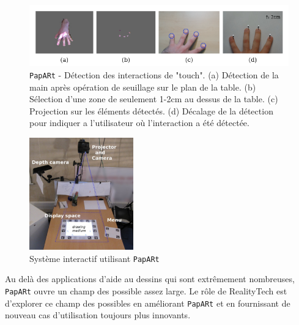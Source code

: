 \begin{figure}
\centering
\includegraphics[width=\linewidth]{images/paparttouch}
\caption{ \texttt{PapARt} - Détection des interactions de "touch". (a) Détection de la main après opération de seuillage sur le plan de la table. (b) Sélection d'une zone de seulement 1-2cm au dessus de la table. (c) Projection sur les éléments détectés. (d) Décalage de la détection pour indiquer a l'utilisateur où l'interaction a été détectée.\protect\footnotemark}
\label{fig:papart:touch}
\end{figure}


\begin{figure}[H]
\centering
\includegraphics[width=0.4\textwidth]{images/papart-system}
\caption{Système interactif utilisant \texttt{PapARt}\protect\footnotemark}
\label{fig:papartsystem}
\end{figure}


Au delà des applications d'aide au dessins qui sont extrêmement nombreuses, \texttt{PapARt} ouvre un champ des possible assez large. Le rôle de RealityTech est d'explorer ce champ des possibles en améliorant \texttt{PapARt} et en fournissant de nouveau cas d'utilisation toujours plus innovants.



